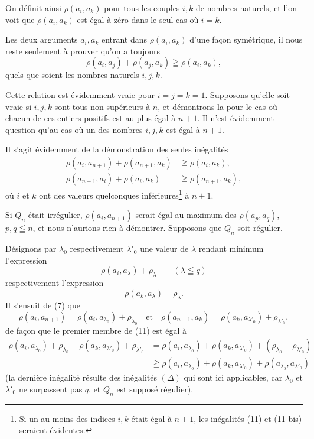 \documentclass[a4paper,12pt]{amsart}
\newcommand{\srcpage}[1]{} %
\begin{document}
On définit ainsi $\rho(a_i,a_k)$ pour tous les couples $i,k$ de nombres naturels, et l'on voit que $\rho(a_i,a_k)$ est égal à zéro dans le seul cas où $i=k$.

Les deux arguments $a_i,a_k$ entrant dans $\rho(a_i,a_k)$ d'une façon symétrique, il nous reste seulement à prouver qu'on a toujours
\begin{equation}\tag{10}
\rho(a_i,a_j)+\rho(a_j,a_k)\geqq\rho(a_i,a_k),
\end{equation}
quels que soient les nombres naturels $i,j,k$.

Cette relation est évidemment vraie pour $i=j=k=1$. Supposons qu'elle soit vraie si $i,j,k$ sont tous non supérieurs à $n$, et démontrons-la pour le cas où chacun de ces entiers positifs est au plus égal à $n+1$. Il n'est évidemment question qu'au cas où un des nombres $i,j,k$ est égal à $n+1$.
\srcpage{55}
Il s'agit évidemment de la démonstration des seules inégalités
\begin{align}
\rho(a_i,a_{n+1})+\rho(a_{n+1},a_k)&\geqq\rho(a_i,a_k),\tag{11}\\
\rho(a_{n+1},a_i)+\rho(a_i,a_k)&\geqq\rho(a_{n+1},a_k),\tag{11 bis}
\end{align}
où $i$ et $k$ ont des valeurs quelconques inférieures\footnote{Si un au moins des indices $i,k$ était égal à $n+1$, les inégalités (11) et (11 bis) seraient évidentes.} à $n+1$.

Si $Q_n$ était irrégulier, $\rho(a_i,a_{n+1})$ serait égal au maximum des $\rho(a_p,a_q)$, $p,q\leqq n$, et nous n'aurions rien à démontrer. Supposons que $Q_n$ soit régulier.

Désignons par $\lambda_0$ respectivement $\lambda'_0$ une valeur de $\lambda$ rendant minimum l'expression
\[
\rho(a_i,a_\lambda)+\rho_\lambda\qquad(\lambda\leqq q)
\]
respectivement l'expression
\[
\rho(a_k,a_\lambda)+\rho_\lambda.
\]
Il s'ensuit de (7) que
\[
\rho(a_i,a_{n+1})=\rho(a_i,a_{\lambda_0})+\rho_{\lambda_0}
\quad\text{et}\quad
\rho(a_{n+1},a_k)=\rho(a_k,a_{\lambda'_0})+\rho_{\lambda'_0},
\]
de façon que le premier membre de (11) est égal à
{\small
\begin{equation}\tag{12}
\begin{aligned}
\rho(a_i,a_{\lambda_0})+\rho_{\lambda_0}+\rho(a_k,a_{\lambda'_0})+\rho_{\lambda'_0}
&=\rho(a_i,a_{\lambda_0})+\rho(a_k,a_{\lambda'_0})+(\rho_{\lambda_0}+\rho_{\lambda'_0})\\
&\geqq\rho(a_i,a_{\lambda_0})+\rho(a_k,a_{\lambda'_0})+\rho(a_{\lambda_0},a_{\lambda'_0})
\end{aligned}
\end{equation}
}
(la dernière inégalité résulte des inégalités $(\Delta)$ qui sont ici applicables, car $\lambda_0$ et $\lambda'_0$ ne surpassent pas $q$, et $Q_n$ est supposé régulier).
\end{document}
